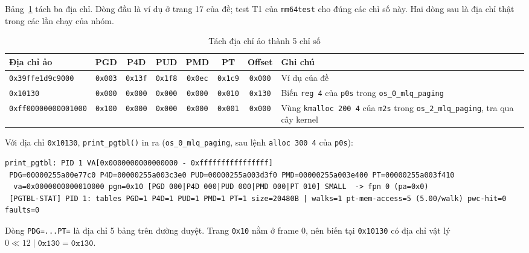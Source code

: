 \documentclass[12pt,a4paper]{article}
\begin{document}
	Bảng~\ref{tab:nhan-split} tách ba địa chỉ. Dòng đầu là ví dụ ở trang 17 của đề; test T1 của \texttt{mm64test} cho đúng các chỉ số này. Hai dòng sau là địa chỉ thật trong các lần chạy của nhóm.
	\begin{table}[H]
	\centering\footnotesize
	\begin{tabularx}{\linewidth}{|l|c|c|c|c|c|c|X|}
	\hline
	\textbf{Địa chỉ ảo} & \textbf{PGD} & \textbf{P4D} & \textbf{PUD} & \textbf{PMD} & \textbf{PT} & \textbf{Offset} & \textbf{Ghi chú} \\
	\hline
	\texttt{0x39ffe1d9c9000} & \texttt{0x003} & \texttt{0x13f} & \texttt{0x1f8} & \texttt{0x0ec} & \texttt{0x1c9} & \texttt{0x000} & Ví dụ của đề \\
	\hline
	\texttt{0x10130} & \texttt{0x000} & \texttt{0x000} & \texttt{0x000} & \texttt{0x000} & \texttt{0x010} & \texttt{0x130} & Biến \texttt{reg 4} của \texttt{p0s} trong \texttt{os\_0\_mlq\_paging} \\
	\hline
	\texttt{0xff00000000001000} & \texttt{0x100} & \texttt{0x000} & \texttt{0x000} & \texttt{0x000} & \texttt{0x001} & \texttt{0x000} & Vùng \texttt{kmalloc 200 4} của \texttt{m2s} trong \texttt{os\_2\_mlq\_paging}, tra qua cây kernel \\
	\hline
	\end{tabularx}
	\caption{Tách địa chỉ ảo thành 5 chỉ số}
	\label{tab:nhan-split}
	\end{table}

	Với địa chỉ \texttt{0x10130}, \texttt{print\_pgtbl()} in ra (\texttt{os\_0\_mlq\_paging}, sau lệnh \texttt{alloc 300 4} của \texttt{p0s}):
	\begin{lstlisting}[basicstyle=\ttfamily\scriptsize]
print_pgtbl: PID 1 VA[0x0000000000000000 - 0xffffffffffffffff]
 PDG=00000255a00e77c0 P4D=00000255a003c3e0 PUD=00000255a003d3f0 PMD=00000255a003e400 PT=00000255a003f410
  va=0x0000000000010000 pgn=0x10 [PGD 000|P4D 000|PUD 000|PMD 000|PT 010] SMALL  -> fpn 0 (pa=0x0)
 [PGTBL-STAT] PID 1: tables PGD=1 P4D=1 PUD=1 PMD=1 PT=1 size=20480B | walks=1 pt-mem-access=5 (5.00/walk) pwc-hit=0 faults=0
	\end{lstlisting}
	Dòng \texttt{PDG=...PT=} là địa chỉ 5 bảng trên đường duyệt. Trang \texttt{0x10} nằm ở frame 0, nên biến tại \texttt{0x10130} có địa chỉ vật lý \(0 \ll 12 \mid \texttt{0x130} = \texttt{0x130}\).
\end{document}
